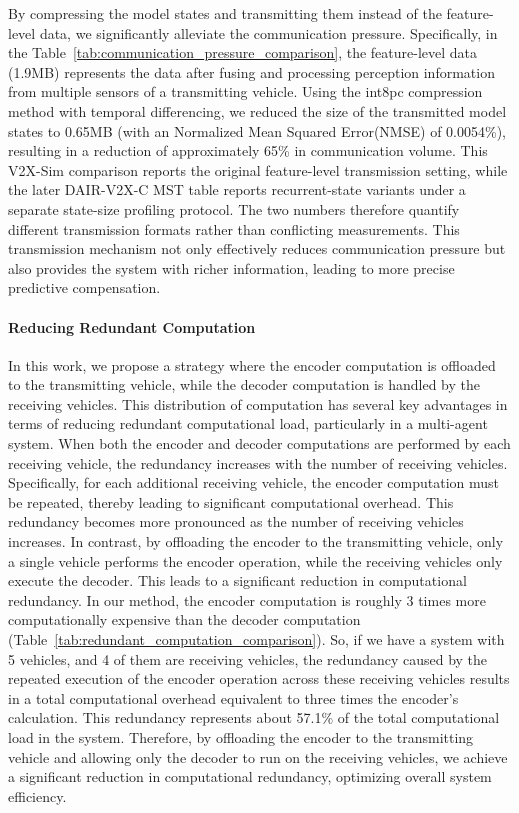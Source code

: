 By compressing the model states and transmitting them instead of the feature-level data, we significantly alleviate the communication pressure. Specifically, in the Table~\ref{tab:communication_pressure_comparison}, the feature-level data (1.9MB) represents the data after fusing and processing perception information from multiple sensors of a transmitting vehicle. Using the int8pc compression method with temporal differencing, we reduced the size of the transmitted model states to 0.65MB (with an Normalized Mean Squared Error(NMSE) of 0.0054\%), resulting in a reduction of approximately 65\% in communication volume. This V2X-Sim comparison reports the original feature-level transmission setting, while the later DAIR-V2X-C MST table reports recurrent-state variants under a separate state-size profiling protocol. The two numbers therefore quantify different transmission formats rather than conflicting measurements. This transmission mechanism not only effectively reduces communication pressure but also provides the system with richer information, leading to more precise predictive compensation. 


\paragraph{Reducing Redundant Computation}
In this work, we propose a strategy where the encoder computation is offloaded to the transmitting vehicle, while the decoder computation is handled by the receiving vehicles. This distribution of computation has several key advantages in terms of reducing redundant computational load, particularly in a multi-agent system. 
When both the encoder and decoder computations are performed by each receiving vehicle, the redundancy increases with the number of receiving vehicles. Specifically, for each additional receiving vehicle, the encoder computation must be repeated, thereby leading to significant computational overhead. This redundancy becomes more pronounced as the number of receiving vehicles increases. In contrast, by offloading the encoder to the transmitting vehicle, only a single vehicle performs the encoder operation, while the receiving vehicles only execute the decoder. This leads to a significant reduction in computational redundancy.
In our method, the encoder computation is roughly 3 times more computationally expensive than the decoder computation (Table~\ref{tab:redundant_computation_comparison}). So, if we have a system with 5 vehicles, and 4 of them are receiving vehicles, the redundancy caused by the repeated execution of the encoder operation across these receiving vehicles results in a total computational overhead equivalent to three times the encoder's calculation. This redundancy represents about 57.1\% of the total computational load in the system. Therefore, by offloading the encoder to the transmitting vehicle and allowing only the decoder to run on the receiving vehicles, we achieve a significant reduction in computational redundancy, optimizing overall system efficiency.

